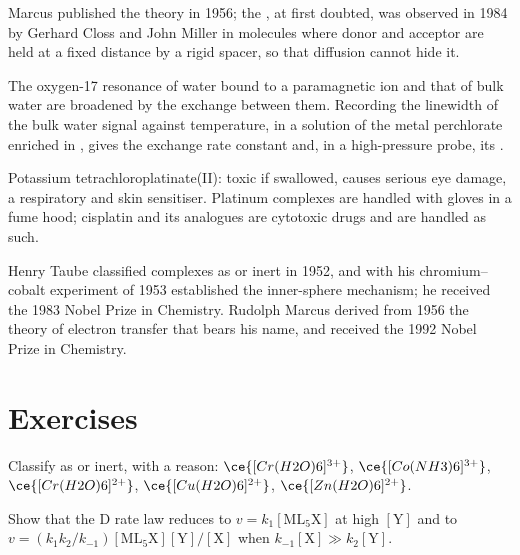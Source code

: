 Marcus published the theory in 1956; the , at first doubted, was
observed in 1984 by Gerhard Closs and John Miller in molecules where donor and
acceptor are held at a fixed distance by a rigid spacer, so that diffusion
cannot hide it.

\begin{inthelab}
The oxygen-17 resonance of water bound to a paramagnetic ion and that of bulk
water are broadened by the exchange between them. Recording the linewidth of the
bulk water signal against temperature, in a solution of the metal perchlorate
enriched in , gives the exchange rate constant and, in a high-pressure probe,
its .
\end{inthelab}

\begin{safety}{}
Potassium tetrachloroplatinate(II): toxic if swallowed, causes serious eye
damage, a respiratory and skin sensitiser. Platinum complexes are handled with
gloves in a fume hood; cisplatin and its analogues are cytotoxic drugs and are
handled as such.
\end{safety}

\begin{history}
Henry Taube classified complexes as  or inert in 1952, and with his
chromium--cobalt experiment of 1953 established the inner-sphere mechanism; he
received the 1983 Nobel Prize in Chemistry. Rudolph Marcus derived from 1956 the
theory of electron transfer that bears his name, and received the 1992 Nobel
Prize in Chemistry.
\end{history}

\section{Exercises}

\begin{exercise}[$\star$]\label{exo:b3:complex-mechanisms:1}
Classify as  or inert, with a reason: $\ce{[Cr(H2O)6]^{3+}}$, $\ce{[Co(NH3)6]^{3+}}$, $\ce{[Cr(H2O)6]^{2+}}$,
$\ce{[Cu(H2O)6]^{2+}}$, $\ce{[Zn(H2O)6]^{2+}}$.
\end{exercise}

\begin{exercise}[$\star$]\label{exo:b3:complex-mechanisms:2}
Show that the D rate law reduces to $v = k_1[\mathrm{ML_5X}]$ at high $[\mathrm Y]$ and to $v = (k_1k_2/k_{-1})
[\mathrm{ML_5X}][\mathrm Y]/[\mathrm X]$ when $k_{-1}[\mathrm X] \gg k_2[\mathrm Y]$.
\end{exercise}

